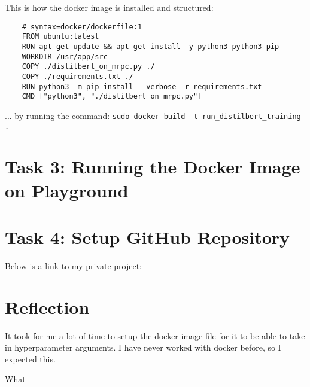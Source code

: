 \documentclass{article}
\begin{document}
This is how the docker image is installed and structured:

\begin{lstlisting}
    # syntax=docker/dockerfile:1
    FROM ubuntu:latest
    RUN apt-get update && apt-get install -y python3 python3-pip
    WORKDIR /usr/app/src
    COPY ./distilbert_on_mrpc.py ./ 
    COPY ./requirements.txt ./ 
    RUN python3 -m pip install --verbose -r requirements.txt
    CMD ["python3", "./distilbert_on_mrpc.py"]
    \end{lstlisting}
... by running the command: 
\verb!sudo docker build -t run_distilbert_training .!

\section{Task 3: Running the Docker Image on Playground}

\section{Task 4: Setup GitHub Repository}
Below is a link to my private project:

\section{Reflection}
It took for me a lot of time to setup the docker image file for it to be able to take in hyperparameter arguments.
I have never worked with docker before, so I expected this. 

What 
\end{document}
